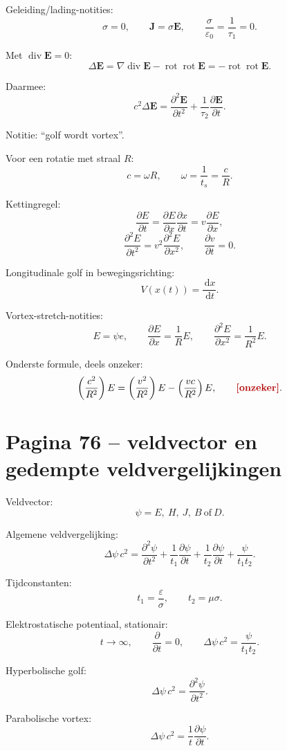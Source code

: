 \documentclass[11pt,a4paper]{article}
\newcommand{\onzeker}[1]{\ifmmode\text{\color{red!70!black}\bfseries[onzeker]}\else\textcolor{red!70!black}{\textbf{[onzeker:} #1\textbf{]}}\fi}
\newcommand{\vect}[1]{\mathbf{#1}}
\newcommand{\dd}{\,\mathrm{d}}
\newcommand{\rot}{\operatorname{rot}}
\newcommand{\Div}{\operatorname{div}}
\newcommand{\grad}{\nabla}
\begin{document}
Geleiding/lading-notities:
$$
\sigma=0,
\qquad
\vect{J}=\sigma\vect{E},
\qquad
\frac{\sigma}{\varepsilon_0}
=
\frac{1}{\tau_1}
=
0.
$$

Met $\Div\vect{E}=0$:
$$
\Delta\vect{E}
=
\grad\Div\vect{E}
-
\rot\rot\vect{E}
=
-\rot\rot\vect{E}.
$$

Daarmee:
$$
c^{2}\Delta\vect{E}
=
\frac{\partial^{2}\vect{E}}{\partial t^{2}}
+
\frac{1}{\tau_2}
\frac{\partial\vect{E}}{\partial t}.
$$

Notitie: ``golf wordt vortex''.

Voor een rotatie met straal $R$:
$$
c=\omega R,
\qquad
\omega=\frac{1}{t_s}
=
\frac{c}{R}.
$$

Kettingregel:
$$
\frac{\partial E}{\partial t}
=
\frac{\partial E}{\partial x}
\frac{\partial x}{\partial t}
=
v\frac{\partial E}{\partial x},
$$
$$
\frac{\partial^{2}E}{\partial t^{2}}
=
v^{2}
\frac{\partial^{2}E}{\partial x^{2}},
\qquad
\frac{\partial v}{\partial t}=0.
$$

Longitudinale golf in bewegingsrichting:
$$
V(x(t))=\frac{\dd x}{\dd t}.
$$

Vortex-stretch-notities:
$$
E=\psi e,
\qquad
\frac{\partial E}{\partial x}
=
\frac{1}{R}E,
\qquad
\frac{\partial^{2}E}{\partial x^{2}}
=
\frac{1}{R^{2}}E.
$$

Onderste formule, deels onzeker:
$$
\left(\frac{c^{2}}{R^{2}}\right)E
=
\left(\frac{v^{2}}{R^{2}}\right)E
-
\left(\frac{vc}{R^{2}}\right)E,
\qquad
\onzeker{c^{2}=v^{2}-vc}.
$$

\section*{Pagina 76 -- veldvector en gedempte veldvergelijkingen}

Veldvector:
$$
\psi = E,\ H,\ J,\ B\ \text{of}\ D.
$$

Algemene veldvergelijking:
$$
\Delta\psi\,c^{2}
=
\frac{\partial^{2}\psi}{\partial t^{2}}
+
\frac{1}{t_1}\frac{\partial\psi}{\partial t}
+
\frac{1}{t_2}\frac{\partial\psi}{\partial t}
+
\frac{\psi}{t_1t_2}.
$$

Tijdconstanten:
$$
t_1=\frac{\varepsilon}{\sigma},
\qquad
t_2=\mu\sigma.
$$

Elektrostatische potentiaal, stationair:
$$
t\to\infty,
\qquad
\frac{\partial}{\partial t}=0,
\qquad
\Delta\psi\,c^{2}
=
\frac{\psi}{t_1t_2}.
$$

Hyperbolische golf:
$$
\Delta\psi\,c^{2}
=
\frac{\partial^{2}\psi}{\partial t^{2}}.
$$

Parabolische vortex:
$$
\Delta\psi\,c^{2}
=
\frac{1}{t}\frac{\partial\psi}{\partial t}.
$$
\end{document}
